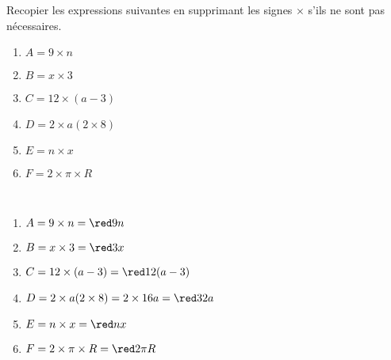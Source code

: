 \begin{exercice}
    Recopier les expressions suivantes en supprimant les signes $\times$ s'ils ne sont pas nécessaires.
    \begin{multicols}{2}
        \begin{enumerate}
        \item $A =9\times n$
        \item $B =x\times3$
        \item $C =12\times(a-3)$
        \item $D =2\times a(2\times8)$
        \item $E =n\times x$
        \item $F =2\times\pi\times R$
        \end{enumerate}
    \end{multicols}
\end{exercice}
    
\begin{corrige}
    \ \\ [-5mm]
    \begin{enumerate}
        \item $A =9\times n =\red9n$
        \item $B =x\times3 =\red3x$
        \item $C =12\times(a-3) =\red12(a-3)$
        \item $D =2\times a(2\times8) =2\times16a =\red32a$
        \item $E =n\times x =\red nx$
        \item $F =2\times\pi\times R =\red2\pi R$
    \end{enumerate}
\end{corrige}